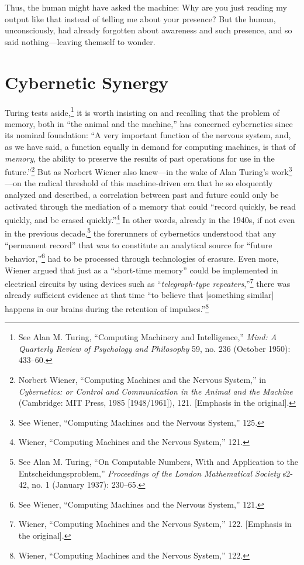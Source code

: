 \documentclass{tufte-handout}
\begin{document}
Thus, the human might have asked the machine: Why are you just reading
my output like that instead of telling me about your presence? But the
human, unconsciously, had already forgotten about awareness and such
presence, and so said nothing---leaving themself to wonder.

\hypertarget{cybernetic-synergy}{%
\section{Cybernetic Synergy}\label{cybernetic-synergy}}

Turing tests aside,\footnote{See Alan M. Turing, ``Computing Machinery
  and Intelligence,'' \emph{Mind: A Quarterly Review of Psychology and
  Philosophy} 59, no. 236 (October 1950): 433--60.} it is worth
insisting on and recalling that the problem of memory, both in ``the
animal and the machine,'' has concerned cybernetics since its nominal
foundation: ``A very important function of the nervous system, and, as
we have said, a function equally in demand for computing machines, is
that of \emph{memory}, the ability to preserve the results of past
operations for use in the future.''\footnote{Norbert Wiener, ``Computing
  Machines and the Nervous System,'' in \emph{Cybernetics: or Control
  and Communication in the Animal and the Machine} (Cambridge: MIT
  Press, 1985 {[}1948/1961{]}), 121. {[}Emphasis in the original{]}.}
But as Norbert Wiener also knew---in the wake of Alan Turing's
work\footnote{See Wiener, ``Computing Machines and the Nervous System,''
  125.}---on the radical threshold of this machine-driven era that he so
eloquently analyzed and described, a correlation between past and future
could only be activated through the mediation of a memory that could
``record quickly, be read quickly, and be erased quickly.''\footnote{Wiener,
  ``Computing Machines and the Nervous System,'' 121.} In other words,
already in the 1940s, if not even in the previous decade,\footnote{See
  Alan M. Turing, ``On Computable Numbers, With and Application to the
  Entscheidungsproblem,'' \emph{Proceedings of the London Mathematical
  Society} s2-42, no. 1 (January 1937): 230--65.} the forerunners of
cybernetics understood that any ``permanent record'' that was to
constitute an analytical source for ``future behavior,''\footnote{See
  Wiener, ``Computing Machines and the Nervous System,'' 121.} had to be
processed through technologies of erasure. Even more, Wiener argued that
just as a ``short-time memory'' could be implemented in electrical
circuits by using devices such as ``\emph{telegraph-type
repeaters},''\footnote{Wiener, ``Computing Machines and the Nervous
  System,'' 122. {[}Emphasis in the original{]}.} there was already
sufficient evidence at that time ``to believe that {[}something
similar{]} happens in our brains during the retention of
impulses.''\footnote{Wiener, ``Computing Machines and the Nervous
  System,'' 122.}
\end{document}
